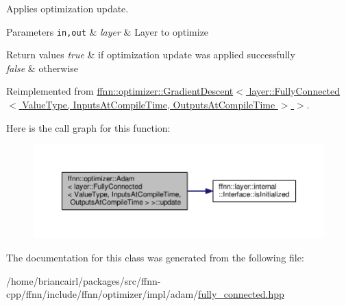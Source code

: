 Applies optimization update. 


\begin{DoxyParams}[1]{Parameters}
\mbox{\tt in,out}  & {\em layer} & Layer to optimize \\
\hline
\end{DoxyParams}

\begin{DoxyRetVals}{Return values}
{\em true} & if optimization update was applied successfully \\
\hline
{\em false} & otherwise \\
\hline
\end{DoxyRetVals}


Reimplemented from \hyperlink{classffnn_1_1optimizer_1_1_gradient_descent_3_01layer_1_1_fully_connected_3_01_value_type_00_01_5f7b01db2ae4d39760d70ee323649a60_a4e15c26f4b561a8ea3ca3de3b324e1cf}{ffnn\-::optimizer\-::\-Gradient\-Descent$<$ layer\-::\-Fully\-Connected$<$ Value\-Type, Inputs\-At\-Compile\-Time, Outputs\-At\-Compile\-Time $>$ $>$}.



Here is the call graph for this function\-:\nopagebreak
\begin{figure}[H]
\begin{center}
\leavevmode
\includegraphics[width=350pt]{classffnn_1_1optimizer_1_1_adam_3_01layer_1_1_fully_connected_3_01_value_type_00_01_inputs_at_co08ce471fd3ee7441a350cc42cfd35bcd_ad42586e39195fc9a72057f20b657f8be_cgraph}
\end{center}
\end{figure}




The documentation for this class was generated from the following file\-:\begin{DoxyCompactItemize}
\item 
/home/briancairl/packages/src/ffnn-\/cpp/ffnn/include/ffnn/optimizer/impl/adam/\hyperlink{optimizer_2impl_2adam_2fully__connected_8hpp}{fully\-\_\-connected.\-hpp}\end{DoxyCompactItemize}
